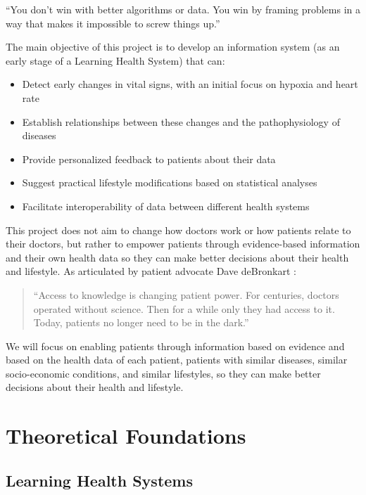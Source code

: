 ``You don't win with better algorithms or data. You win by framing problems in a way that makes it impossible to screw things up.'' \cite{Santiago2024}

The main objective of this project is to develop an information system (as an early stage of a Learning Health System) that can:

\begin{itemize}
\item Detect early changes in vital signs, with an initial focus on hypoxia and heart rate
\item Establish relationships between these changes and the pathophysiology of diseases
\item Provide personalized feedback to patients about their data
\item Suggest practical lifestyle modifications based on statistical analyses
\item Facilitate interoperability of data between different health systems
\end{itemize}

This project does not aim to change how doctors work or how patients relate to their doctors, but rather to empower patients through evidence-based information and their own health data so they can make better decisions about their health and lifestyle. As articulated by patient advocate Dave deBronkart \cite{deBronkart2023}:

\begin{quote}
``Access to knowledge is changing patient power. For centuries, doctors operated without science. Then for a while only they had access to it. Today, patients no longer need to be in the dark.''
\end{quote}

We will focus on enabling patients through information based on evidence and based on the health data of each patient, patients with similar diseases, similar socio-economic conditions, and similar lifestyles, so they can make better decisions about their health and lifestyle.

\section{Theoretical Foundations} \label{sec:theoretical}

\subsection{Learning Health Systems}

